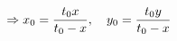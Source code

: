 \documentclass[preview]{standalone}
\begin{document}
\begin{align*}
\special{dvisvgm:raw <g id='unique000'>}\Rightarrow x_0=\frac{t_0 x}{t_0-x},\quad y_0=\frac{t_0 y}{t_0-x}\special{dvisvgm:raw </g>}
\end{align*}
\end{document}

